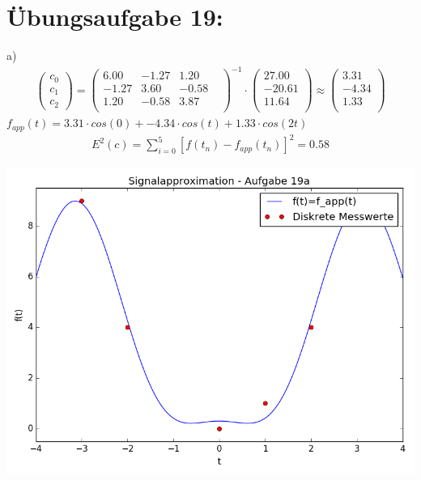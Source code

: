 	\section*{Übungsaufgabe 19:}
	a) \newline
	\begin{align*}
	\left(\begin{matrix}c_0\\c_1\\c_2\end{matrix}\right) =
	\left(\begin{matrix}
			6.00 & -1.27 & 1.20 & \\
			-1.27 & 3.60 & -0.58 & \\
			1.20 & -0.58 & 3.87 & \\
	\end{matrix}\right)^{-1} \cdot
	\left(\begin{matrix}
			27.00\\
			-20.61\\
			11.64\\
	\end{matrix}\right) \approx
	\left(\begin{matrix}
			3.31\\
			-4.34\\
			1.33\\
	\end{matrix}\right)
	\end{align*}
	$f_{app}(t) = 3.31 \cdot cos(0) + -4.34 \cdot cos(t) + 1.33 \cdot cos(2t) $
	\begin{align*}
			E^2(c) = \sum_{i=0}^5 \left[ f(t_n) - f_{app}(t_n)\right]^2 = 0.58
	\end{align*}

	\includegraphics[scale=0.8]{A19a.png}

